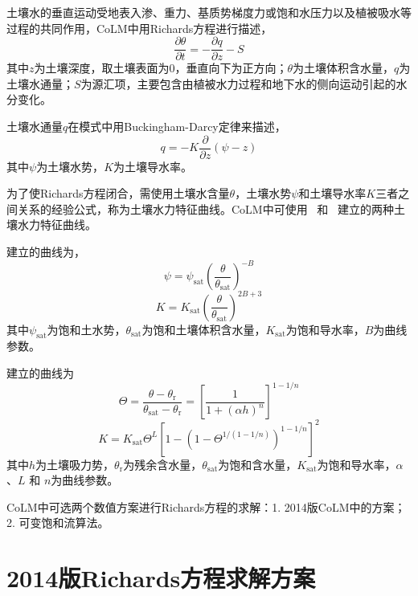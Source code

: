 土壤水的垂直运动受地表入渗、重力、基质势梯度力或饱和水压力以及植被吸水等过程的共同作用，CoLM中用Richards方程进行描述，
\begin{equation}
  \frac{\partial \theta}{\partial t}=-\frac{\partial q}{\partial z}-S
\end{equation}
其中$z$为土壤深度，取土壤表面为0，垂直向下为正方向；$\theta$为土壤体积含水量，$q$为土壤水通量；$S$为源汇项，主要包含由植被水力过程和地下水的侧向运动引起的水分变化。

土壤水通量$q$在模式中用Buckingham-Darcy定律来描述，
\begin{equation}
  q=-K \frac{\partial}{\partial z}(\psi-z)
\end{equation}
其中$\psi$为土壤水势，$K$为土壤导水率。

为了使Richards方程闭合，需使用土壤水含量$\theta$，土壤水势$\psi$和土壤导水率$K$三者之间关系的经验公式，称为土壤水力特征曲线。CoLM中可使用~\citet{campbell1974} 和~\citet{van1980closed} 建立的两种土壤水力特征曲线。

\citet{campbell1974}建立的曲线为，
\begin{equation}\label{eq:SW_CB}
  \psi=\psi_{\mathrm{sat}}\left(\frac{\theta}{\theta_{\mathrm{sat}}}\right)^{-B}
\end{equation}
\begin{equation}\label{eq:Ks_CB}
  K=K_{\mathrm{sat}}\left(\frac{\theta}{\theta_{\mathrm{sat}}}\right)^{2 B+3}
\end{equation}
其中$\psi_{\mathrm {sat}} $为饱和土水势，$\theta_{\mathrm{sat}}$为饱和土壤体积含水量，$K_{\mathrm{sat}}$为饱和导水率，$B$为曲线参数。

\citet{van1980closed} 建立的曲线为
\begin{equation}\label{eq:SW_VG}
  \Theta = \frac{\theta-\theta_{\mathrm {r}} }{\theta_{\mathrm {sat}} -\theta_{\mathrm {r}} } = \left[\frac{1}{1+\left(\alpha h\right)^n}\right]^{1-1/n}
\end{equation}
\begin{equation}\label{eq:Ks_VG}
  K = K_{\mathrm {sat}}  \Theta^L \left[1-\left(1-\Theta^{1/\left(1-1/n\right)}\right)^{1-1/n}\right]^2
\end{equation}
其中$h$为土壤吸力势，$\theta_{\mathrm {r}} $为残余含水量，$\theta_{\mathrm {sat}} $为饱和含水量，$K_{\mathrm{sat}}$为饱和导水率，$\alpha$、$L$ 和 $n$为曲线参数。

CoLM中可选两个数值方案进行Richards方程的求解：1. 2014版CoLM中的方案；2. 可变饱和流算法。

\section{2014版Richards方程求解方案}

